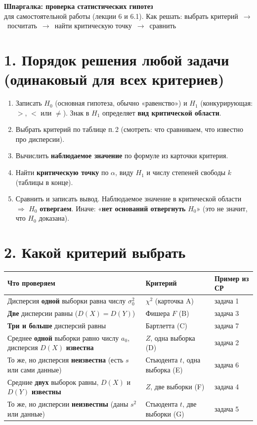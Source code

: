 \begin{center}
{\Large\bfseries Шпаргалка: проверка статистических гипотез}\\[2pt]
{\small для самостоятельной работы (лекции 6 и 6.1). Как решать: выбрать критерий \,$\to$\, посчитать \,$\to$\, найти критическую точку \,$\to$\, сравнить}
\end{center}

\section*{1. Порядок решения любой задачи (одинаковый для всех критериев)}
\begin{enumerate}[label=\bfseries Шаг \arabic*.,leftmargin=3.6em]
\item Записать $H_0$ (основная гипотеза, обычно «равенство») и $H_1$ (конкурирующая: $>$, $<$ или $\ne$). Знак в $H_1$ определяет \textbf{вид критической области}.
\item Выбрать критерий по таблице п.\,2 (смотреть: что сравниваем, что известно про дисперсии).
\item Вычислить \textbf{наблюдаемое значение} по формуле из карточки критерия.
\item Найти \textbf{критическую точку} по $\alpha$, виду $H_1$ и числу степеней свободы $k$ (таблицы в конце).
\item Сравнить и записать вывод. Наблюдаемое значение в критической области $\Rightarrow$ $H_0$ \textbf{отвергаем}. Иначе: «\textbf{нет оснований отвергнуть} $H_0$» (это не значит, что $H_0$ доказана).
\end{enumerate}

\section*{2. Какой критерий выбрать}
\renewcommand{\arraystretch}{1.25}
\noindent\begin{tabular}{@{}>{\raggedright\arraybackslash}p{7.6cm}>{\raggedright\arraybackslash}p{4.4cm}>{\raggedright\arraybackslash}p{5.3cm}@{}}
\toprule
\textbf{Что проверяем} & \textbf{Критерий} & \textbf{Пример из СР} \\\midrule
Дисперсия \textbf{одной} выборки равна числу $\sigma_0^2$ & $\chi^2$ (карточка A) & задача 1 \\
\textbf{Две} дисперсии равны ($D(X)=D(Y)$) & Фишера $F$ (B) & задача 3 \\
\textbf{Три и больше} дисперсий равны & Бартлетта (C) & задача 7 \\
Среднее \textbf{одной} выборки равно числу $a_0$, дисперсия $D(X)$ \textbf{известна} & $Z$, одна выборка (D) & задача 2 \\
То же, но дисперсия \textbf{неизвестна} (есть $s$ или сами данные) & Стьюдента $t$, одна выборка (E) & задача 6 \\
Средние \textbf{двух} выборок равны, $D(X)$ и $D(Y)$ \textbf{известны} & $Z$, две выборки (F) & задача 4 \\
То же, но дисперсии \textbf{неизвестны} (даны $s^2$ или данные) & Стьюдента $t$, две выборки (G) & задача 5 \\
\bottomrule
\end{tabular}

